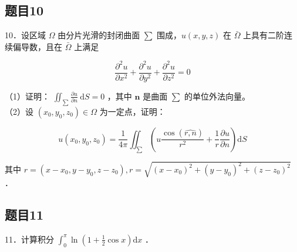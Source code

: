 \documentclass{article}
\begin{document}
\subsection{题目10}
10．设区域 \(\Omega\) 由分片光滑的封闭曲面 \(\sum\) 围成，\(u(x, y, z)\) 在 \(\bar{\Omega}\) 上具有二阶连续偏导数，且在 \(\bar{\Omega}\) 上满足

\[
\frac{\partial^{2} u}{\partial x^{2}}+\frac{\partial^{2} u}{\partial y^{2}}+\frac{\partial^{2} u}{\partial z^{2}}=0
\]

（1）证明： \(\iint_{\sum} \frac{\partial u}{\partial n} \mathrm{~d} S=0\) ，其中 \(\mathbf{n}\) 是曲面 \(\sum\) 的单位外法向量。\\
（2）设 \(\left(x_{0}, y_{0}, z_{0}\right) \in \Omega\) 为一定点，证明：

\[
u\left(x_{0}, y_{0}, z_{0}\right)=\frac{1}{4 \pi} \iint_{\sum}\left(u \frac{\cos (\widehat{r, n})}{r^{2}}+\frac{1}{r} \frac{\partial u}{\partial n}\right) \mathrm{d} S
\]

其中 \(r=\left(x-x_{0}, y-y_{0}, z-z_{0}\right), r=\sqrt{\left(x-x_{0}\right)^{2}+\left(y-y_{0}\right)^{2}+\left(z-z_{0}\right)^{2}}\) ．

\subsection{题目11}
11．计算积分 \(\int_{0}^{\pi} \ln \left(1+\frac{1}{2} \cos x\right) \mathrm{d} x\) ．
\end{document}
